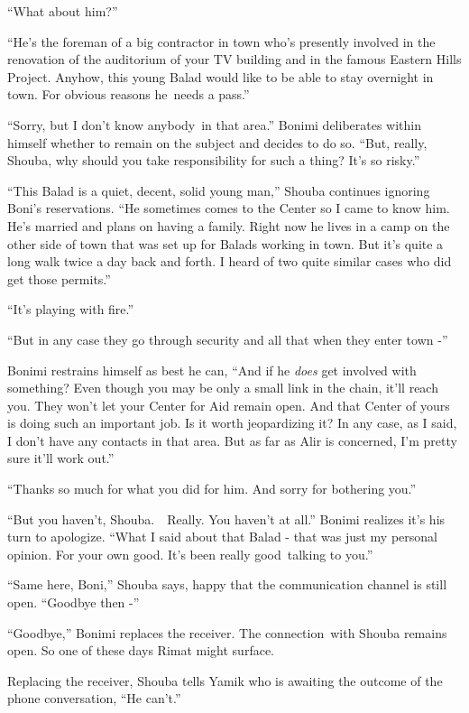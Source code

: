 \documentclass[twoside,11pt]{book}
\begin{document}
``What about him?''

``He's the foreman of a big contractor in town who's presently involved in the renovation of the auditorium
of your TV building and in the famous Eastern Hills Project. Anyhow, this young Balad would like to be able to stay
overnight in town. For obvious reasons he~needs a pass.''

``Sorry, but I don't know anybody~in that area.'' Bonimi deliberates within himself whether to
remain on the subject and decides to do so. ``But, really, Shouba, why should you take responsibility for
such a thing? It's so risky.'' 

``This Balad is a quiet, decent, solid young man,'' Shouba continues ignoring Boni's
reservations. ``He sometimes comes to the Center so I came to know him. He's married and plans on having a
family. Right now he lives in a camp on the other side of town that was set up for Balads working in town. But it's
quite a long walk twice a day back and forth. I heard of two quite similar cases who did get those
permits.''

``It's playing with fire.'' 

``But in any case they go through security and all that when they enter town -''

Bonimi restrains himself as best he can, ``And if he \textit{does} get involved with something? Even though
you may be only a small link in the chain, it'll reach you. They won't let your Center for Aid remain open. And that
Center of yours is doing such an important job. Is it worth jeopardizing it? In any case, as I said, I don't have any
contacts in that area. But as far as Alir is concerned, I'm pretty sure it'll work out.'' 

``Thanks so much for what you did for him. And sorry for bothering you.'' 

``But you haven't, Shouba.\ \ Really. You haven't at all.'' Bonimi realizes it's his turn to
apologize. ``What I said about that Balad - that was just my personal opinion. For your own good. It's
been really good{\ }talking to you.'' 

``Same here, Boni,'' Shouba says, happy that the communication channel is still open.
``Goodbye then -'' 

``Goodbye,'' Bonimi replaces the receiver. The connection~with Shouba remains open. So one of
these days Rimat might surface. 

Replacing the receiver, Shouba tells Yamik who is awaiting the outcome of the phone conversation, ``He
can't.''
\end{document}
